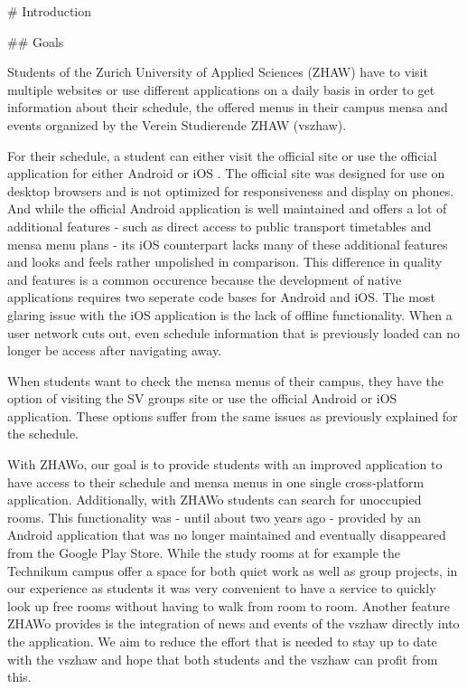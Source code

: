 \begin{markdown}

# Introduction

## Goals

Students of the Zurich University of Applied Sciences (ZHAW) have to visit multiple websites or use different applications on a daily basis in order to get information about their schedule, the offered menus in their campus mensa and events organized by the Verein Studierende ZHAW (vszhaw).

For their schedule, a student can either visit the official site \cite{Stundenplan} or use the official application for either Android \cite{AppAndroid} or iOS \cite{AppIOS}. The official site was designed for use on desktop browsers and is not optimized for responsiveness and display on phones. And while the official Android application is well maintained and offers a lot of additional features - such as direct access to public transport timetables and mensa menu plans - its iOS counterpart lacks many of these additional features and looks and feels rather unpolished in comparison. This difference in quality and features is a common occurence because the development of native applications requires two seperate code bases for Android and iOS. The most glaring issue with the iOS application is the lack of offline functionality. When a user network cuts out, even schedule information that is previously loaded can no longer be access after navigating away.

When students want to check the mensa menus of their campus, they have the option of visiting the SV groups site or use the official Android or iOS application. These options suffer from the same issues as previously explained for the schedule.

With ZHAWo, our goal is to provide students with an improved application to have access to their schedule and mensa menus in one single cross-platform application. Additionally, with ZHAWo students can search for unoccupied rooms. This functionality was - until about two years ago - provided by an Android application that was no longer maintained and eventually disappeared from the Google Play Store. While the study rooms at for example the Technikum campus offer a space for both quiet work as well as group projects, in our experience as students it was very convenient to have a service to quickly look up free rooms without having to walk from room to room. Another feature ZHAWo provides is the integration of news and events of the vszhaw directly into the application. We aim to reduce the effort that is needed to stay up to date with the vszhaw and hope that both students and the vszhaw can profit from this.


\end{markdown}
